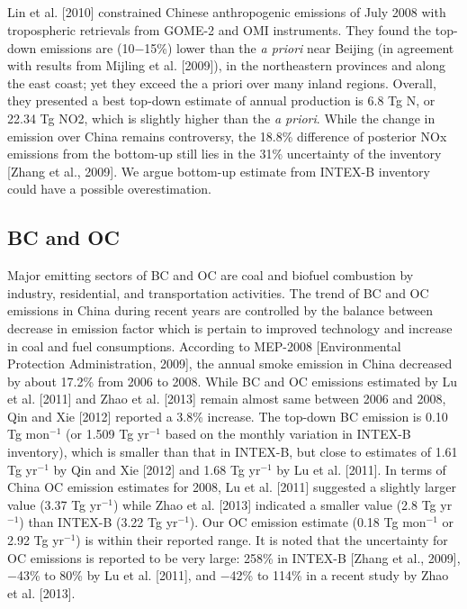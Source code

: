  \subsection{} 
  Lin et al. [2010] constrained Chinese anthropogenic emissions of  July 2008 with tropospheric  retrievals from GOME-2 and OMI instruments.
They found the top-down emissions are (10$-$15\%) lower than the \textit{a priori} near Beijing (in agreement with results from Mijling et al. [2009]),
in the northeastern provinces and along the east coast; yet they exceed the a priori over many inland regions. 
Overall, they presented a best top-down estimate of annual  production is 6.8 Tg N, or 22.34 Tg NO2, which is slightly higher than the \textit{a priori}. 
While the change in  emission over China remains controversy, the 18.8\% difference of posterior NOx emissions from the bottom-up still lies in the 31\% uncertainty of the inventory [Zhang et al., 2009].
We argue bottom-up  estimate from INTEX-B inventory could have a possible overestimation.   

 \subsection{BC and OC}  
  Major emitting sectors of BC and OC are coal and biofuel combustion by industry, residential, and transportation activities. 
The trend of BC and OC emissions in China during recent years are controlled by the balance between decrease in emission factor which is pertain to improved technology and increase in coal and fuel consumptions. 
According to MEP-2008 [Environmental Protection Administration, 2009], the annual smoke emission in China decreased by about 17.2\% from 2006 to 2008. 
While BC and OC emissions estimated by Lu et al. [2011] and Zhao et al. [2013] remain almost same between 2006 and 2008, Qin and Xie [2012] reported a 3.8\% increase. 
The top-down BC emission is 0.10 Tg mon$^{-1}$ (or 1.509 Tg yr$^{-1}$ based on the monthly variation in INTEX-B inventory), which is smaller than that in INTEX-B, but close to estimates of 1.61 Tg yr$^{-1}$ by Qin and Xie [2012] and 1.68 Tg yr$^{-1}$ by Lu et al. [2011]. 
In terms of China OC emission estimates for 2008, Lu et al. [2011] suggested a slightly larger value (3.37 Tg yr$^{-1}$) while Zhao et al. [2013] indicated a smaller value (2.8 Tg yr$^{-1}$) than INTEX-B (3.22 Tg yr$^{-1}$).  Our OC emission estimate (0.18 Tg mon$^{-1}$ or 2.92 Tg yr$^{-1}$) is within their reported range. 
It is noted that the uncertainty for OC emissions is reported to be very large: 258\% in INTEX-B [Zhang et al., 2009], $-$43\% to 80\% by Lu et al. [2011], and $-$42\% to 114\% in a recent study by Zhao et al. [2013].

